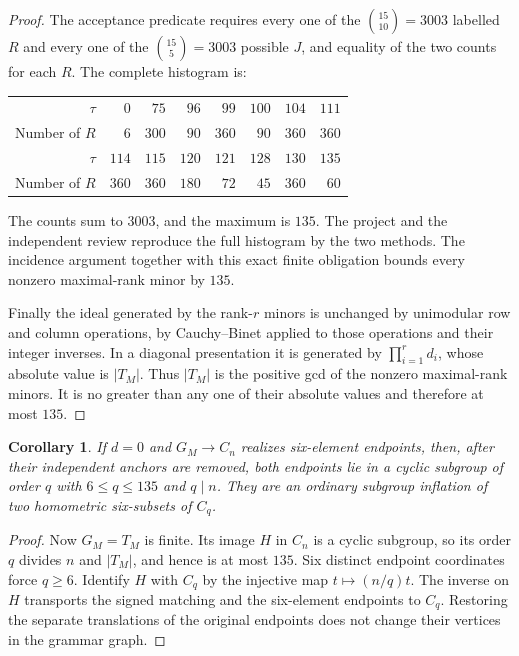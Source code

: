 \documentclass[11pt]{article}
\newtheorem{corollary}[theorem]{Corollary}
\theoremstyle{remark}
\begin{document}
\begin{proof}
The acceptance predicate requires every one of the $\binom{15}{10}=3003$
labelled $R$ and every one of the $\binom{15}{5}=3003$ possible $J$,
and equality of the two counts for each $R$. The complete histogram is:
\begin{center}\small
\begin{tabular}{r|rrrrrrr}
\toprule
$\tau$ & $0$ & $75$ & $96$ & $99$ & $100$ & $104$ & $111$\\
Number of $R$ & $6$ & $300$ & $90$ & $360$ & $90$ & $360$ & $360$\\
\midrule
$\tau$ & $114$ & $115$ & $120$ & $121$ & $128$ & $130$ & $135$\\
Number of $R$ & $360$ & $360$ & $180$ & $72$ & $45$ & $360$ & $60$\\
\bottomrule
\end{tabular}
\end{center}
The counts sum to $3003$, and the maximum is $135$. The project and
the independent review reproduce the full histogram by the two methods.
The incidence argument together with this exact finite obligation bounds
every nonzero maximal-rank minor by $135$.

Finally the ideal generated by the rank-$r$ minors is unchanged by
unimodular row and column operations, by Cauchy--Binet applied to those
operations and their integer inverses. In a diagonal presentation it
is generated by $\prod_{i=1}^r d_i$, whose absolute value is $|T_M|$.
Thus $|T_M|$ is the positive gcd of the nonzero maximal-rank minors.
It is no greater than any one of their absolute values and therefore
at most $135$.
\end{proof}

\begin{corollary}\label{cor:finite}
If $d=0$ and $G_M\to C_n$ realizes six-element endpoints, then, after
their independent anchors are removed, both endpoints lie in a cyclic
subgroup of order $q$ with $6\le q\le135$ and $q\mid n$. They are an
ordinary subgroup inflation of two homometric six-subsets of $C_q$.
\end{corollary}
\begin{proof}
Now $G_M=T_M$ is finite. Its image $H$ in $C_n$ is a cyclic subgroup,
so its order $q$ divides $n$ and $|T_M|$, and hence is at most $135$.
Six distinct endpoint coordinates force $q\ge6$. Identify $H$ with
$C_q$ by the injective map $t\mapsto(n/q)t$. The inverse on $H$
transports the signed matching and the six-element endpoints to $C_q$.
Restoring the separate translations of the original endpoints does not
change their vertices in the grammar graph.
\end{proof}
\end{document}
